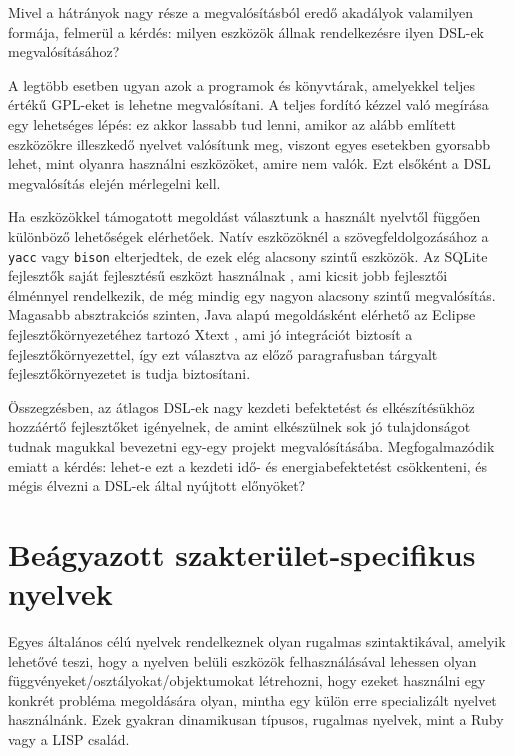Mivel a hátrányok nagy része a megvalósításból eredő akadályok valamilyen formája, felmerül a kérdés: milyen eszközök állnak rendelkezésre ilyen \gls{DSL}-ek megvalósításához?

A legtöbb esetben ugyan azok a programok és könyvtárak, amelyekkel teljes értékű \gls{GPL}-eket is lehetne megvalósítani.
A teljes fordító kézzel való megírása egy lehetséges lépés: ez akkor lassabb tud lenni, amikor az alább említett eszközökre illeszkedő nyelvet valósítunk meg, viszont egyes esetekben gyorsabb lehet, mint olyanra használni eszközöket, amire nem valók.
Ezt elsőként a \gls{DSL} megvalósítás elején mérlegelni kell.

Ha eszközökkel támogatott megoldást választunk a használt nyelvtől függően különböző lehetőségek elérhetőek. 
Natív eszközöknél a szövegfeldolgozásához a {\tt yacc} vagy {\tt bison} \cite{freesoftwarefoundationinc.BisonGNUProject1988} elterjedtek, de ezek elég alacsony szintű eszközök.
Az SQLite fejlesztők saját fejlesztésű eszközt használnak \cite{hippwyrick&companyinc.LEMONParserGenerator2025}, ami kicsit jobb fejlesztői élménnyel rendelkezik, de még mindig egy nagyon alacsony szintű megvalósítás.
Magasabb absztrakciós szinten, Java alapú megoldásként elérhető az Eclipse fejlesztőkörnyezetéhez tartozó Xtext \cite{eclisefoundationXtextLanguageEngineering2025}, ami jó integrációt biztosít a fejlesztőkörnyezettel, így ezt választva az előző paragrafusban tárgyalt fejlesztőkörnyezetet is tudja biztosítani.

Összegzésben, az átlagos \gls{DSL}-ek nagy kezdeti befektetést és elkészítésükhöz hozzáértő fejlesztőket igényelnek, de amint elkészülnek sok jó tulajdonságot tudnak magukkal bevezetni egy-egy projekt megvalósításába.
Megfogalmazódik emiatt a kérdés: lehet-e ezt a kezdeti idő- és energiabefektetést csökkenteni, és mégis élvezni a \gls{DSL}-ek által nyújtott előnyöket?

\section{Beágyazott szakterület-specifikus nyelvek}\label{chr:dsl:edsl}

Egyes általános célú nyelvek rendelkeznek olyan rugalmas szintaktikával, amelyik lehetővé teszi, hogy a nyelven belüli eszközök felhasználásával lehessen olyan függvényeket/osztályokat/objektumokat létrehozni, hogy ezeket használni egy konkrét probléma megoldására olyan, mintha egy külön erre specializált nyelvet használnánk.
Ezek gyakran dinamikusan típusos, rugalmas nyelvek, mint a Ruby vagy a LISP család.


